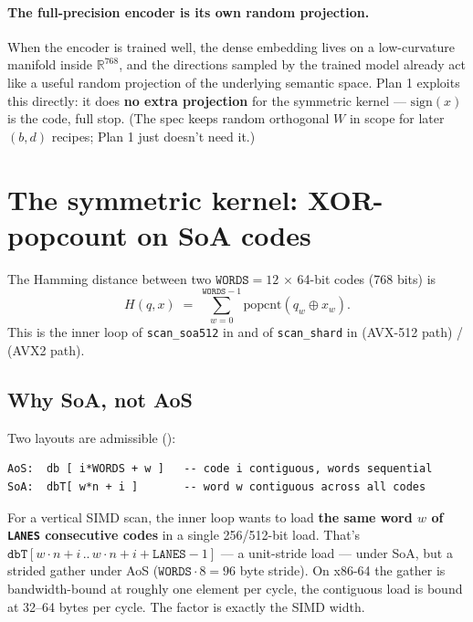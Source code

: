 \documentclass[11pt,a4paper]{article}
\begin{document}
\paragraph{The full-precision encoder is its own random projection.}
When the encoder is trained well, the dense embedding lives on a
low-curvature manifold inside $\mathbb{R}^{768}$, and the directions
sampled by the trained model already act like a useful random
projection of the underlying semantic space. Plan 1 exploits this
directly: it does \textbf{no extra projection} for the symmetric
kernel --- $\mathrm{sign}(x)$ is the code, full stop. (The spec keeps
random orthogonal $W$ in scope for later $(b, d)$ recipes; Plan 1
just doesn't need it.)

\section{The symmetric kernel: XOR-popcount on SoA codes}

The Hamming distance between two $\texttt{WORDS} = 12$ $\times$ 64-bit
codes (768 bits) is
\begin{equation}
H(q, x) \;=\; \sum_{w=0}^{\texttt{WORDS}-1} \mathrm{popcnt}(q_w \oplus x_w).
\end{equation}
This is the inner loop of \texttt{scan\_soa512} in
 and of \texttt{scan\_shard} in
 (AVX-512 path) /
 (AVX2 path).

\subsection{Why SoA, not AoS}

Two layouts are admissible ():

\begin{lstlisting}[style=plainstyle]
AoS:  db [ i*WORDS + w ]   -- code i contiguous, words sequential
SoA:  dbT[ w*n + i ]       -- word w contiguous across all codes
\end{lstlisting}

For a vertical SIMD scan, the inner loop wants to load \textbf{the same
word $w$ of \texttt{LANES} consecutive codes} in a single 256/512-bit
load. That's $\texttt{dbT}[w \cdot n + i \,..\, w \cdot n + i +
\texttt{LANES} - 1]$ --- a unit-stride load --- under SoA, but a
strided gather under AoS ($\texttt{WORDS} \cdot 8 = 96$ byte stride).
On x86-64 the gather is bandwidth-bound at roughly one element per
cycle, the contiguous load is bound at 32--64 bytes per cycle. The
factor is exactly the SIMD width.
\end{document}
